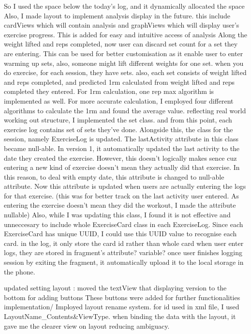 So I used the space below the today's log, and it dynamically allocated the space
Also, I made layout to implement analysis display in the future.
this include cardViews which will contain analysis and graphViews which will display user's exercise progress.
This is added for easy and intuitive access of analysis
Along the weight lifted and reps completed, now user can discard set count for a set they are entering.
This can be used for better customisation as it enable user to enter  warming up sets, also, someone might lift different weights for one set. 
when you do exercise, for each session, they have sets.
also, each set consists of weight lifted and reps completed, and predicted 1rm calculated from weight lifted and reps completed they entered.
For 1rm calculation, one rep max algorithm is implemented as well.
For more accurate calculation, I employed four different algorithms to calculate the 1rm and found the average value. 
reflecting real world working out structure, I implemented the set class.
and from this point, each exercise log contains set of sets they've done.
Alongside this, the class for the session, namely ExerciseLog is updated.
The lastActivity attribute in this class became null-able.
In version 1, it automatically updated the last activity to the date they created the exercise.
However, this doesn't logically makes sence cuz entering a new kind of exercise doesn't mean they actually did that exercise.
In this reason, to deal with empty date, this attribute is changed to null-able attribute. 
Now this attribute is updated when users are actually entering the logs for that exercise.
(this was for better track on the last activity user entered. 
As entering the exercise doesn't mean they did the workout, I made the attribute nullable)
Also, while I was updating this class, I found it is not effective and unneccesary to include whole ExerciseCard class in each ExerciseLog.
Since each ExerciseCard has unique UUID, I could use this UUID value to recognise each card.
in the log, it only store the card id rather than whole card
when user enter logs, they are stored in fragment's attribute? variable?
once user finishes logging session by exiting the fragment,
it automatically upload it to the local storage in the phone.


updated setting layout : 
moved the textView that displaying version to the bottom for adding buttons
These buttons were added for further functionalities implementation/
Imployed layout rename system.
for id used in xml file, I used LayoutName_Contents&ViewType.
when binding the data with the layout, it gave me the clearer view on layout reducing ambiguacy. 




